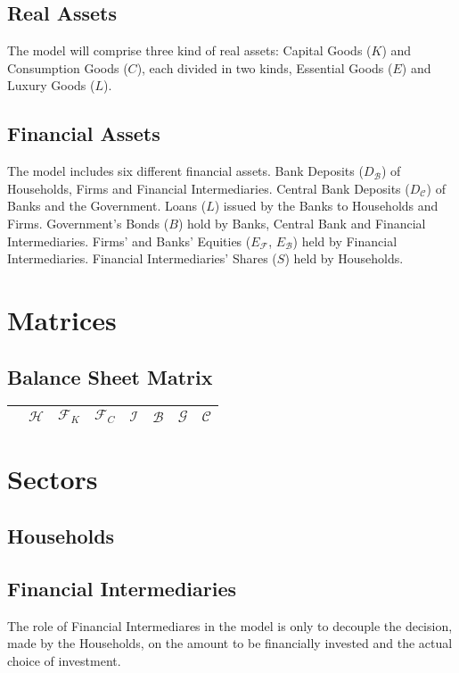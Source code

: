 \documentclass[a4paper, headings=standardclasses]{scrartcl}
\begin{document}
\subsection{Real Assets}
The model will comprise three kind of real assets: Capital Goods ($K$) and Consumption Goods ($C$), each divided in two kinds, Essential Goods ($E$) and Luxury Goods ($L$).

\subsection{Financial Assets}
The model includes six different financial assets. 
Bank Deposits ($D_\mathcal{B}$) of Households, Firms and Financial Intermediaries. 
Central Bank Deposits ($D_\mathcal{C}$) of Banks and the Government. 
Loans ($L$) issued by the Banks to Households and Firms. Government's Bonds ($B$) hold by Banks, Central Bank and Financial Intermediaries. 
Firms' and Banks' Equities ($E_\mathcal{F}$, $E_\mathcal{B}$) held by Financial Intermediaries.
Financial Intermediaries' Shares ($S$) held by Households.

\section{Matrices}
\subsection{Balance Sheet Matrix}

\begin{tabular}{|l|ccccccc|}
	\toprule
	& $\mathcal{H}$ & $\mathcal{F}_K$ & $\mathcal{F}_C$ & $\mathcal{I}$ & $\mathcal{B}$ & $\mathcal{G}$ & $\mathcal{C}$ \\
	\midrule
\end{tabular}

\section{Sectors}
\subsection{Households}

\subsection{Financial Intermediaries}
The role of Financial Intermediares in the model is only to decouple the decision, made by the Households, on the amount to be financially invested and the actual choice of investment.
\end{document}
